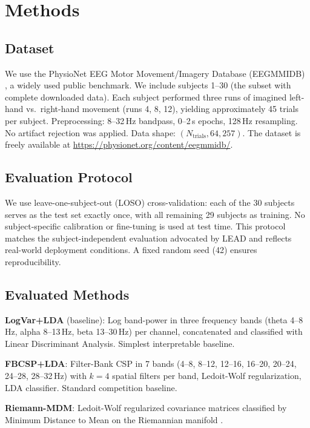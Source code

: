 \documentclass[conference]{IEEEtran}
\begin{document}
\section{Methods}
\label{sec:methods}

\subsection{Dataset}
We use the PhysioNet EEG Motor Movement/Imagery Database (EEGMMIDB)
\cite{schalk2004bci2000, goldberger2000physiobank}, a widely used public
benchmark. We include subjects 1--30 (the subset with complete downloaded data).
Each subject performed three runs of imagined left-hand vs.\ right-hand movement
(runs 4, 8, 12), yielding approximately 45 trials per subject.
Preprocessing: 8--32\,Hz bandpass, 0--2\,s epochs, 128\,Hz resampling.
No artifact rejection was applied. Data shape: $(N_\text{trials}, 64, 257)$.
The dataset is freely available at \url{https://physionet.org/content/eegmmidb/}.

\subsection{Evaluation Protocol}
We use leave-one-subject-out (LOSO) cross-validation: each of the 30 subjects
serves as the test set exactly once, with all remaining 29 subjects as training.
No subject-specific calibration or fine-tuning is used at test time.
This protocol matches the subject-independent evaluation advocated by
LEAD \cite{lead2025} and reflects real-world deployment conditions.
A fixed random seed (42) ensures reproducibility.

\subsection{Evaluated Methods}

\textbf{LogVar+LDA} (baseline): Log band-power in three frequency bands
(theta 4--8\,Hz, alpha 8--13\,Hz, beta 13--30\,Hz) per channel, concatenated
and classified with Linear Discriminant Analysis. Simplest interpretable baseline.

\textbf{FBCSP+LDA}: Filter-Bank CSP \cite{ang2008filter} in 7 bands
(4--8, 8--12, 12--16, 16--20, 20--24, 24--28, 28--32\,Hz) with $k=4$
spatial filters per band, Ledoit-Wolf regularization, LDA classifier.
Standard competition baseline.

\textbf{Riemann-MDM}: Ledoit-Wolf regularized covariance matrices classified
by Minimum Distance to Mean on the Riemannian manifold
\cite{barachant2012multiclass}.
\end{document}
